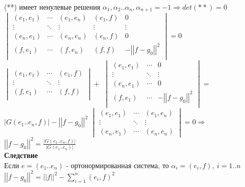(**) имеет ненулевые решения $\alpha_1,\alpha_2..\alpha_n,\alpha_{n+1} = -1 \Rightarrow det (**) = 0$\\
$\begin{vmatrix}
  (e_1,e_1) & \cdots & (e_1,e_n) & (e_1,f) & 0 \\
  \vdots & \ddots & \vdots & \vdots & \vdots \\
  (e_n,e_1) & \cdots & (e_n,e_n) & (e_n,f) & 0 \\
  (f,e_1) & \cdots & (f,e_n) & (f,f) & -\left| \left|  f-g_0 \right| \right|^2 \\
 \end{vmatrix} = 0$ \\
$\begin{vmatrix}
  (e_1,e_1) & \cdots & (e_1,f) \\
  \vdots & \ddots & \vdots \\
  (f,e_1) & \cdots & (f,f) \\
 \end{vmatrix} + $
$\begin{vmatrix}
  (e_1,e_1) & \cdots & 0 \\
  \vdots & \ddots & \vdots \\
  (e_n,e_1) & \cdots & 0 \\
  (f,e_1) & \cdots & -\left| \left|  f-g_0 \right| \right|^2 \\
 \end{vmatrix} = $
$\left| G(e_1..e_n,f) \right| - \left| \left|  f-g_0 \right| \right|^2$
$\begin{vmatrix}
  (e_1,e_1) & \cdots & (e_1,e_n) \\
  \vdots & \ddots & \vdots \\
  (e_n,e_1) & \cdots & (e_n,e_n)
 \end{vmatrix} = 0 \Rightarrow $
$\left| \left|  f-g_0 \right| \right|^2 = \frac{\left| G(e_1..e_n,f) \right|}{\left| G(e_1..e_n) \right|}$ \\
\textbf{Следствие} \\
Если $e=(e_1..e_n)$ - ортонормированная система, то $\alpha_i=(e_i,f), \ i=1..n$\\
$\left| \left|  f-g_0 \right| \right|^2 = \left| \left|  f \right| \right|^2 - \sum \limits_{i=1}^n {(e_i,f)^2}$ \\

 

 

